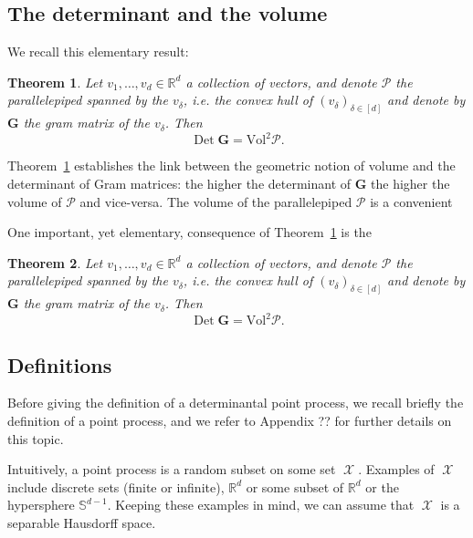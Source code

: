 \documentclass[twoside,11pt]{book}
\newtheorem{theorem}{Theorem}
\numberwithin{theorem}{chapter}
\numberwithin{definition}{chapter}
\numberwithin{proposition}{chapter}
\numberwithin{corollary}{chapter}
\numberwithin{example}{chapter}
\numberwithin{lemma}{chapter}
\DeclareMathOperator{\Det}{Det}
\DeclareMathOperator{\X}{\mathcal{X}}
\begin{document}
\subsection{The determinant and the volume}
We recall this elementary result:
\begin{theorem}\label{thm:link_det_vol}
Let $v_{1}, \dots, v_{d} \in \mathbb{R}^{d}$ a collection of vectors, and denote $\mathcal{P}$ the parallelepiped spanned by the $v_{\delta}$, i.e. the convex hull of $(v_{\delta})_{\delta \in [d]}$ and denote by $\bm{G}$ the gram matrix of the $v_{\delta}$. Then
\begin{equation}
\Det \bm{G} = \mathrm{Vol}^{2} \mathcal{P}. \nonumber
\end{equation}
\end{theorem}
Theorem~\ref{thm:link_det_vol} establishes the link between the geometric notion of volume and the determinant of Gram matrices: the higher the determinant of $\bm{G}$ the higher the volume of $\mathcal{P}$ and vice-versa. The volume of the parallelepiped $\mathcal{P}$ is a convenient 

One important, yet elementary, consequence of Theorem~\ref{thm:link_det_vol} is the 


\begin{theorem}\label{thm:vol_base_times_height}
Let $v_{1}, \dots, v_{d} \in \mathbb{R}^{d}$ a collection of vectors, and denote $\mathcal{P}$ the parallelepiped spanned by the $v_{\delta}$, i.e. the convex hull of $(v_{\delta})_{\delta \in [d]}$ and denote by $\bm{G}$ the gram matrix of the $v_{\delta}$. Then
\begin{equation}
\Det \bm{G} = \mathrm{Vol}^{2} \mathcal{P}. \nonumber
\end{equation}
\end{theorem}






\subsection{Definitions}
Before giving the definition of a determinantal point process, we recall briefly the definition of a point process, and we refer to Appendix ?? for further details on this topic.

Intuitively, a point process is a random subset on some set $\X$. Examples of $\X$ include discrete sets (finite or infinite), $\mathbb{R}^{d}$ or some subset of $\mathbb{R}^{d}$ or the hypersphere $\mathbb{S}^{d-1}$. Keeping these examples in mind, we can assume that $\X$ is a separable Hausdorff space.
\end{document}
